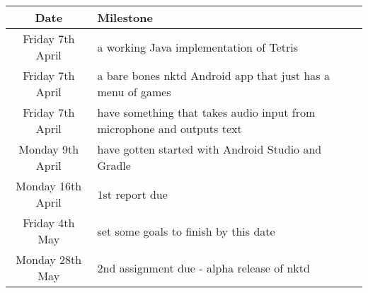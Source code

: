 \documentclass[11pt, oneside]{article}
\begin{document}
\begin{table}[h!]
  \centering
  \begin{tabular}{|c|l|}
    \hline
    Date & Milestone\\
    \hline
    Friday 7th April & a working Java implementation of Tetris \\

    Friday 7th April & a bare bones nktd Android app that just has a
    menu of games \\

    Friday 7th April & have something that takes audio input from
    microphone and outputs text \\

    Monday 9th April & have gotten started with Android Studio and Gradle \\

    Monday 16th April & 1st report due \\

    Friday 4th May & set some goals to finish by this date \\

    Monday 28th May & 2nd assignment due - alpha release of nktd \\
    \hline
  \end{tabular}
\end{table}


\end{document}
